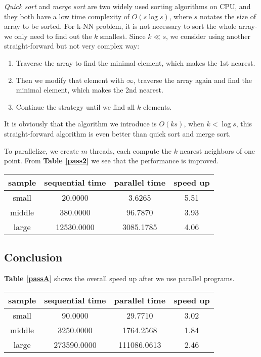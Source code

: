 \documentclass[11pt, a4paper]{article}
\makeatletter
\newcommand\tcaption{\def\@captype{table}\caption}
\newcommand{\tref}[1]{\textbf{Table \ref{#1}}}
\makeatother
\begin{document}
\textit{Quick sort} and \textit{merge sort} are two widely used sorting algorithms on CPU, and they both have a low time complexity of $O(s \log s)$, where $s$ notates the size of array to be sorted. For k-NN problem, it is not necessary to sort the whole array-we only need to find out the $k$ smallest. Since $k \ll s$, we consider using another straight-forward but not very complex way:

\begin{enumerate}
    \item Traverse the array to find the minimal element, which makes the 1st nearest.
    \item Then we modify that element with $\infty$, traverse the array again and find the minimal element, which makes the 2nd nearest.
    \item Continue the strategy until we find all $k$ elements.
\end{enumerate}

It is obviously that the algorithm we introduce is $O(ks)$, when $k < \log s$, this straight-forward algorithm is even better than quick sort and merge sort.

To parallelize, we create $m$ threads, each compute the $k$ nearest neighbors of one point. From \tref{pass2} we see that the performance is improved.

\begin{center}
    \tcaption{Time cost of second pass: sort}\label{pass2}
    \begin{tabular}{cccc}
        \toprule
        sample & sequential time & parallel time & speed up \\
        \midrule
        small & 20.0000 & 3.6265 & 5.51 \\
        middle & 380.0000 & 96.7870 & 3.93 \\
        large & 12530.0000 & 3085.1785 & 4.06 \\
        \bottomrule
    \end{tabular}
\end{center}

\subsection{Conclusion}

\tref{passA} shows the overall speed up after we use parallel programs.

\begin{center}
    \tcaption{Time cost of both passes after parallel}\label{passA}
    \begin{tabular}{cccc}
        \toprule
        sample & sequential time & parallel time & speed up \\
        \midrule
        small & 90.0000 & 29.7710 & 3.02 \\
        middle & 3250.0000 & 1764.2568 & 1.84 \\
        large & 273590.0000 & 111086.0613 & 2.46 \\
        \bottomrule
    \end{tabular}
\end{center}
\end{document}
